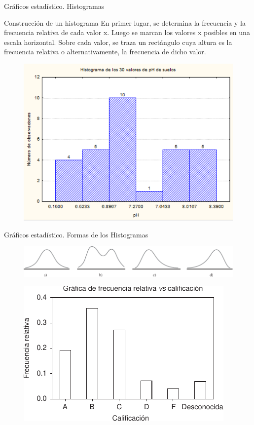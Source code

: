 \documentclass[11pt]{beamer}
\begin{document}
      \begin{frame}{Gráficos estadístico. Histogramas}
        \pause
        \begin{block}{Construcción de un histograma}
          En primer lugar, se determina la frecuencia y la frecuencia relativa de cada valor x.
Luego se marcan los valores x posibles en una escala horizontal. Sobre cada valor, se
traza un rectángulo cuya altura es la frecuencia relativa o alternativamente, la frecuencia de dicho valor.
        \end{block}
        \begin{figure}
            \centering
            \includegraphics[width=0.5\linewidth]{images/histograma}

            \label{fig:histograma}
        \end{figure}
      \end{frame}

       \begin{frame}{Gráficos estadístico. Formas de los Histogramas }
         \begin{figure}
             \centering
             \includegraphics[width=0.7\linewidth]{images/formas_histograma}
             \label{fig:formashistograma}
         \end{figure}
         \pause
         \begin{figure}
             \centering
             \includegraphics[width=0.7\linewidth]{images/cualitativo_histograma}
             \caption{}
             \label{fig:cualitativohistograma}
         \end{figure}


      \end{frame}
\end{document}

